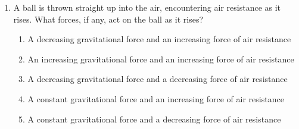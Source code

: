 \documentclass{../../../oss-classkick}
\begin{document}
\begin{multicols*}{2}
\begin{enumerate}[resume,leftmargin=18pt]

  \item A ball is thrown straight up into the air, encountering air resistance
    as it rises. What forces, if any, act on the ball as it rises?
    \begin{enumerate}[nosep,leftmargin=18pt,label=(\Alph*)]
    \item A decreasing gravitational force and an increasing force of air
      resistance
    \item An increasing gravitational force and an increasing force of air
      resistance
    \item A decreasing gravitational force and a decreasing force of air
      resistance
    \item A constant gravitational force and an increasing force of air
      resistance
    \item A constant gravitational force and a decreasing force of air
      resistance
    \end{enumerate}
    \vspace{.65in}
    
  

\end{enumerate}
\end{multicols*}
\end{document}
